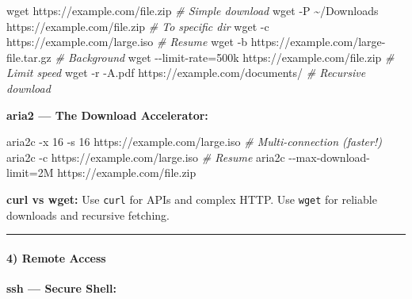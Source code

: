 \documentclass[
  english,
  paper=a4,
  oneside  ,captions=tableheading
]{scrartcl}
\newenvironment{Shaded}{}{}
\newcommand{\AttributeTok}[1]{\textcolor[rgb]{0.49,0.56,0.16}{#1}}
\newcommand{\CommentTok}[1]{\textcolor[rgb]{0.38,0.63,0.69}{\textit{#1}}}
\newcommand{\ExtensionTok}[1]{#1}
\newcommand{\FunctionTok}[1]{\textcolor[rgb]{0.02,0.16,0.49}{#1}}
\newcommand{\NormalTok}[1]{#1}
\newcommand{\OperatorTok}[1]{\textcolor[rgb]{0.40,0.40,0.40}{#1}}
\renewenvironment{quote}{\begin{customblockquote}\list{}{\rightmargin=0em\leftmargin=0em}%
\item\relax\color{blockquote-text}\ignorespaces}{\unskip\unskip\endlist\end{customblockquote}}
\begin{document}
\begin{Shaded}
\begin{Highlighting}[]
\FunctionTok{wget}\NormalTok{ https://example.com/file.zip                }\CommentTok{\# Simple download}
\FunctionTok{wget} \AttributeTok{{-}P}\NormalTok{ \textasciitilde{}/Downloads https://example.com/file.zip }\CommentTok{\# To specific dir}
\FunctionTok{wget} \AttributeTok{{-}c}\NormalTok{ https://example.com/large.iso            }\CommentTok{\# Resume}
\FunctionTok{wget} \AttributeTok{{-}b}\NormalTok{ https://example.com/large{-}file.tar.gz    }\CommentTok{\# Background}
\FunctionTok{wget} \AttributeTok{{-}{-}limit{-}rate}\OperatorTok{=}\NormalTok{500k https://example.com/file.zip }\CommentTok{\# Limit speed}
\FunctionTok{wget} \AttributeTok{{-}r} \AttributeTok{{-}A.pdf}\NormalTok{ https://example.com/documents/    }\CommentTok{\# Recursive download}
\end{Highlighting}
\end{Shaded}

\textbf{aria2 --- The Download Accelerator:}

\begin{Shaded}
\begin{Highlighting}[]
\ExtensionTok{aria2c} \AttributeTok{{-}x}\NormalTok{ 16 }\AttributeTok{{-}s}\NormalTok{ 16 https://example.com/large.iso }\CommentTok{\# Multi{-}connection (faster!)}
\ExtensionTok{aria2c} \AttributeTok{{-}c}\NormalTok{ https://example.com/large.iso           }\CommentTok{\# Resume}
\ExtensionTok{aria2c} \AttributeTok{{-}{-}max{-}download{-}limit}\OperatorTok{=}\NormalTok{2M https://example.com/file.zip}
\end{Highlighting}
\end{Shaded}

\begin{quote}
\textbf{curl vs wget:} Use \texttt{curl} for APIs and complex HTTP. Use
\texttt{wget} for reliable downloads and recursive fetching.
\end{quote}

\begin{center}\rule{0.5\linewidth}{0.5pt}\end{center}

\paragraph{4) Remote Access}\label{remote-access}

\textbf{ssh --- Secure Shell:}
\end{document}
